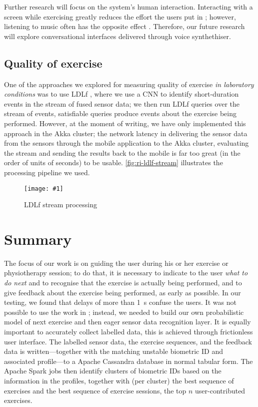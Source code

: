\documentclass[a4paper, 10 pt, conference]{IEEEtran}
\newcommand{\fig}[3]{
  \begin{figure}[h]
    \begin{center}
        \caption{#3}
        \texttt{[image: \#1]}
        \label{fig:#2}
    \end{center}
  \end{figure}
}
\begin{document}
Further research will focus on the system's human interaction. Interacting with a screen while exercising greatly reduces the effort the users put in \cite{!!!}; however, listening to music often has the opposite effect \cite{!!!}. Therefore, our future research will explore conversational interfaces delivered through voice synthethiser. 

\subsection{Quality of exercise}

One of the approaches we explored for measuring quality of exercise \emph{in laboratory conditions} was to use LDLf \cite{ldlf}, where we use a CNN to identify short-duration events in the stream of fused sensor data; we then run LDLf queries over the stream of events, satisfiable queries produce events about the exercise being performed. However, at the moment of writing, we have only implemented this approach in the Akka cluster; the network latency in delivering the sensor data from the sensors through the mobile application to the Akka cluster, evaluating the stream and sending the results back to the mobile is far too great (in the order of units of seconds) to be usable. \autoref{fig:ri-ldlf-stream} illustrates the processing pipeline we used.

\fig{ri-ldlf-stream.png}{ri-ldlf-stream}{LDLf stream processing}

\section{Summary}

The focus of our work is on guiding the user during his or her exercise or physiotherapy session; to do that, it is necessary to indicate to the user \emph{what to do next} and to recognise that the exercise is actually being performed, and to give feedback about the exercise being performed, as early as possible. In our testing, we found that delays of more than \SI{1}{\second} confuse the users. It was not possible to use the work in \cite{morris:2014ir}; instead, we needed to build our own probabilistic model of next exercise and then eager sensor data recognition layer. It is equally important to accurately collect labelled data, this is achieved through frictionless user interface. The labelled sensor data, the exercise sequences, and the feedback data is written---together with the matching unstable biometric ID and associated profile---to a Apache Cassandra database in normal tabular form. The Apache Spark jobs then identify clusters of biometric IDs based on the information in the profiles, together with (per cluster) the best sequence of exercises and the best sequence of exercise sessions, the top $n$ user-contributed exercises.
\end{document}
